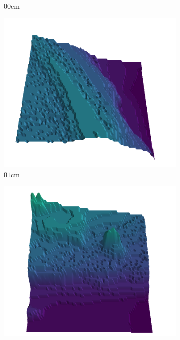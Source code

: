 \documentclass[../document.tex]{subfiles}
\begin{document}
\begin{figure}[H]
\begin{subfigure}[b]{0.19\textwidth}
        \caption{$00$cm}
        \end{subfigure}
        \begin{subfigure}[b]{0.19\textwidth}
        \includegraphics[width=\linewidth]{../img/5/quarry/all/worst/01-patch-3d-majavi-colormap-2.png}
        \caption{$01$cm}
        \end{subfigure}
        \begin{subfigure}[b]{0.19\textwidth}
        \includegraphics[width=\linewidth]{../img/5/quarry/all/worst/01-patch-3d-majavi-colormap-3.png}

\end{subfigure}
\end{figure}
\end{document}
